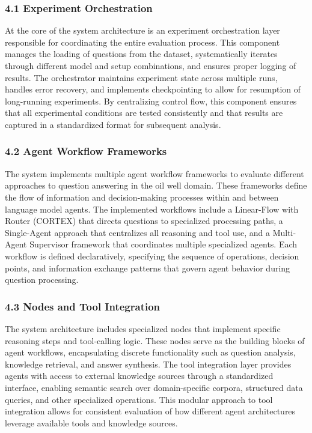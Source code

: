             \subsubsection{4.1 Experiment Orchestration}

            At the core of the system architecture is an experiment orchestration layer responsible for coordinating the entire evaluation process. This component manages the loading of questions from the dataset, systematically iterates through different model and setup combinations, and ensures proper logging of results. The orchestrator maintains experiment state across multiple runs, handles error recovery, and implements checkpointing to allow for resumption of long-running experiments. By centralizing control flow, this component ensures that all experimental conditions are tested consistently and that results are captured in a standardized format for subsequent analysis.

            \subsubsection{4.2 Agent Workflow Frameworks}

            The system implements multiple agent workflow frameworks to evaluate different approaches to question answering in the oil well domain. These frameworks define the flow of information and decision-making processes within and between language model agents. The implemented workflows include a Linear-Flow with Router (CORTEX) that directs questions to specialized processing paths, a Single-Agent approach that centralizes all reasoning and tool use, and a Multi-Agent Supervisor framework that coordinates multiple specialized agents. Each workflow is defined declaratively, specifying the sequence of operations, decision points, and information exchange patterns that govern agent behavior during question processing.

            \subsubsection{4.3 Nodes and Tool Integration}

            The system architecture includes specialized nodes that implement specific reasoning steps and tool-calling logic. These nodes serve as the building blocks of agent workflows, encapsulating discrete functionality such as question analysis, knowledge retrieval, and answer synthesis. The tool integration layer provides agents with access to external knowledge sources through a standardized interface, enabling semantic search over domain-specific corpora, structured data queries, and other specialized operations. This modular approach to tool integration allows for consistent evaluation of how different agent architectures leverage available tools and knowledge sources.

